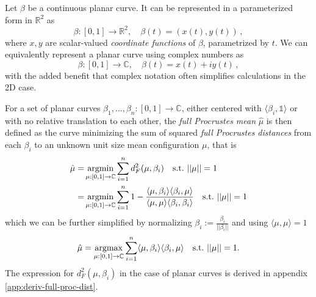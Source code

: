 
Let $\beta$ be a continuous planar curve.
It can be represented in a parameterized form in $\mathbb{R}^2$ as
$$ \beta : [0,1] \rightarrow \mathbb{R}^2,\quad \beta(t) = ( x(t), y(t)) \,, $$
where $x, y$ are scalar-valued \textit{coordinate functions} of $\beta$, parametrized by $t$.
We can equivalently represent a planar curve using complex numbers as
$$ \beta : [0,1] \rightarrow \mathbb{C},\quad \beta(t) = x(t) + iy(t) \,, $$
with the added benefit that complex notation often simplifies calculations in the 2D case.

For a set of planar curves $\beta_1,\dots,\beta_n : [0,1] \rightarrow \mathbb{C}$, either centered with $\langle \beta_i, \mathbb{1} \rangle$ or with no relative translation to each other, the \textit{full Procrustes mean} $\hat{\mu}$ is then defined as the curve minimizing the sum of squared \textit{full Procrustes distances} from each $\beta_i$ to an unknown unit size mean configuration $\mu$, that is
\begin{align*}
    \hat{\mu} =& \operatorname*{argmin}_{\mu:[0,1]\rightarrow\mathbb{C}} \sum_{i=1}^n d^2_F(\mu,\beta_i)
    \quad\text{s.t.}\,\, ||\mu|| = 1 \\
    =& \operatorname*{argmin}_{\mu:[0,1]\rightarrow\mathbb{C}} \sum_{i=1}^n 1 - \frac{\langle \mu, \beta_i \rangle \langle \beta_i, \mu \rangle}{\langle \mu, \mu \rangle \langle \beta_i, \beta_i \rangle}
    \quad\text{s.t.}\,\, ||\mu|| = 1
\end{align*}
which we can be further simplified by normalizing $\beta_i := \frac{\beta_i}{|| \beta_i ||}$ and using $\langle \mu, \mu \rangle = 1$
$$ \hat{\mu} = \operatorname*{argmax}_{\mu:[0,1]\rightarrow\mathbb{C}} \sum_{i=1}^n \langle \mu, \beta_i \rangle \langle \beta_i, \mu \rangle \quad\text{s.t.}\,\, ||\mu|| = 1. $$
The expression for $d^2_F(\mu,\beta_i)$ in the case of planar curves is derived in appendix \ref{app:deriv-full-proc-dist}.





